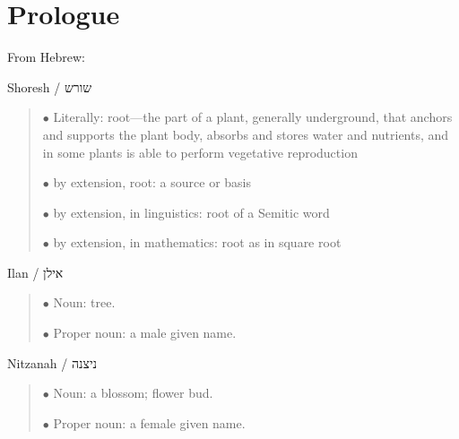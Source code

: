 \chapter*{Prologue}\label{prologue}


From Hebrew:

Shoresh /  {\large שורש }

\begin{quote}
	$\bullet$ Literally: root---the part of a plant, generally underground, that anchors and supports the plant body, absorbs and stores water and nutrients, and in some plants is able to perform vegetative reproduction

	$\bullet$ by extension, root: a source or basis

	$\bullet$ by extension, in linguistics: root of a Semitic word

	$\bullet$ by extension, in mathematics: root as in square root
\end{quote}

\bigskip

Ilan /  {\large אילן}

\begin{quote}
	$\bullet$ Noun: tree.
	
	$\bullet$ Proper noun: a male given name.
	
\end{quote}

\bigskip

Nitzanah /  {\large ניצנה}

\begin{quote}
	$\bullet$ Noun: a blossom; flower bud.
	
	$\bullet$ Proper noun: a female given name.
	
\end{quote}

\bigskip
	
